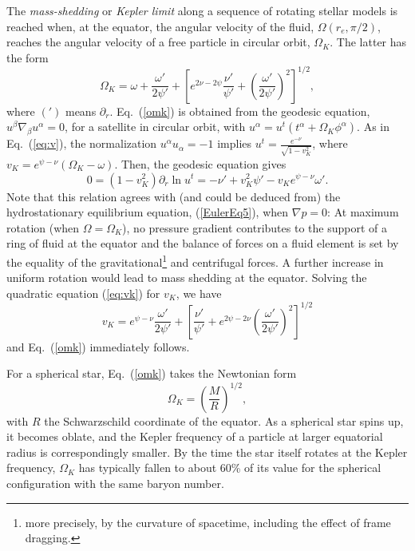 \documentclass[12pt]{article}
\def\be{\begin{equation}}
\def\ee{\end{equation}}
\begin{document}
{%
%
The {\it mass-shedding} or {\it Kepler limit} along a sequence of rotating 
stellar models is reached when, at the equator, the angular velocity of the fluid, $\Omega(r_e,\pi/2)$, reaches the angular velocity of a free particle in circular orbit, $\Omega_K$. The latter has the form 
\be
\Omega_K = \omega+ \frac{\omega'}{2\psi'} 
        +\left[e^{2\nu -2\psi}\frac{\nu'}{\psi'}
        +\left(\frac{\omega'}{2\psi'}\right)^2\right]^{1/2},  
\label{omk}
\ee
where $(')$ means $\partial_r$.
Eq.~(\ref{omk}) is obtained from the geodesic equation,
$u^\beta \nabla_\beta u^\alpha =0$, for a satellite in circular 
orbit, with $u^\alpha = u^t(t^\alpha + \Omega_K\phi^\alpha)$.  
As in Eq.~(\ref{eq:v}),
the normalization $u^\alpha u_\alpha = -1$ implies 
$\displaystyle u^t = \frac{e^{-\nu}}{\sqrt{1-v_K^2}}$, where  
$v_K = e^{\psi-\nu}(\Omega_K-\omega)$. Then, the geodesic equation gives 
\be 
0 = (1-v_K^2)\partial_r\ln u^t 
= -\nu'+v_K^2\psi' -v_Ke^{\psi-\nu}\omega'.
\label{eq:vk}\ee
Note that this relation agrees with (and could be deduced from) 
the hydrostationary equilibrium equation, (\ref{EulerEq5}),
when $\nabla p=0$: At maximum rotation (when $\Omega=\Omega_K$), no 
pressure gradient contributes to the support of a ring of fluid at 
the equator and the balance of forces on a fluid element is set by
the equality of the gravitational\footnote{more precisely, by the
curvature of spacetime, including the effect of frame dragging.}
 and centrifugal forces. 
A further increase in uniform rotation would lead to mass shedding 
at the equator.
%
%
Solving the quadratic equation (\ref{eq:vk}) for $v_K$, we have 
\[ 
v_K = e^{\psi-\nu}\frac{\omega'}{2\psi'} +\left[\frac{\nu'}{\psi'} 
                +e^{2\psi-2\nu}\left(\frac{\omega'}{2\psi'}\right)^2\right]^{1/2}
\]
and Eq.~(\ref{omk}) immediately follows.

For a spherical star, Eq.~(\ref{omk}) takes the Newtonian form
\be
\Omega_K = \left(\frac MR\right)^{1/2},
\label{omksphere}\ee
with $R$ the Schwarzschild coordinate of the equator.
As a spherical star spins up, it becomes oblate, and the Kepler
frequency of a particle at larger equatorial radius is correspondingly
smaller.  By the time the star itself rotates at the Kepler frequency,
$\Omega_K$ has typically fallen to about 60\% of its value for the
spherical configuration with the same baryon number.

}
\end{document}
